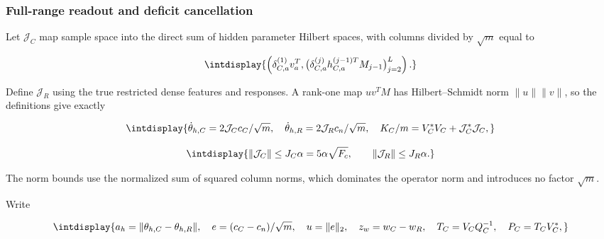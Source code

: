 \subsubsection{Full-range readout and deficit cancellation}
\label{int:compact-cancellation-proof}
\label{int:harmonic-cancellation-proof}


Let \(\mathcal J_C\) map sample space into the direct sum of hidden parameter Hilbert spaces, with columns divided by \(\sqrt m\) equal to


\begingroup\renewcommand{\theHequation}{intdisplay.584}
\begin{equation*}
\intdisplay{
\left(\delta_{C,a}^{(1)}v_a^T,
 \bigl(\delta_{C,a}^{(j)}h_{C,a}^{(j-1)T}M_{j-1}\bigr)_{j=2}^L\right).
}
\end{equation*}
\endgroup


Define \(\mathcal J_R\) using the true restricted dense features and responses. A rank-one map \(u v^TM\) has Hilbert--Schmidt norm \(\|u\|\|v\|\), so the definitions give exactly


\begingroup\renewcommand{\theHequation}{intdisplay.585}
\begin{equation*}
\intdisplay{
\dot\theta_{h,C}=2\mathcal J_Cc_C/\sqrt m,\quad
\dot\theta_{h,R}=2\mathcal J_Rc_n/\sqrt m,\quad
K_C/m=V_C^*V_C+\mathcal J_C^*\mathcal J_C,
}
\end{equation*}
\endgroup

\begingroup\renewcommand{\theHequation}{intdisplay.586}
\begin{equation}
\intdisplay{
\|\mathcal J_C\|\le J_C\alpha=5\alpha\sqrt{F_c},\qquad
\|\mathcal J_R\|\le J_R\alpha.
}
\label{int:eq-0247-harmonic-hidden-velocity-identities}
\end{equation}
\endgroup


The norm bounds use the normalized sum of squared column norms, which dominates the operator norm and introduces no factor \(\sqrt m\).



Write


\begingroup\renewcommand{\theHequation}{intdisplay.587}
\begin{equation*}
\intdisplay{
a_h=\|\theta_{h,C}-\theta_{h,R}\|,\quad
e=(c_C-c_n)/\sqrt m,\quad u=\|e\|_2,\quad
z_w=w_C-w_R,\quad T_C=V_CQ_C^{-1},\quad P_C=T_CV_C^*,
}
\end{equation*}
\endgroup

